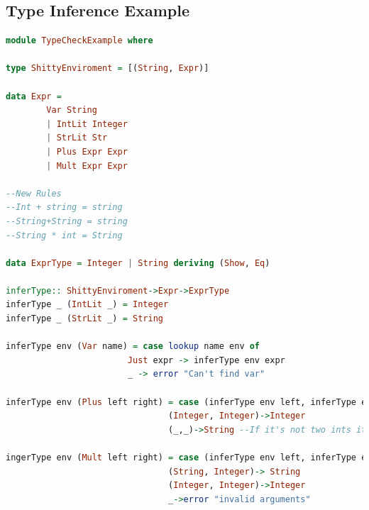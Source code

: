 \documentclass[tikz, border=5mm]{article}
\begin{document}
    \subsection{Type Inference Example}
    \begin{lstlisting}[language=Haskell]
module TypeCheckExample where

type ShittyEnviroment = [(String, Expr)]

data Expr = 
        Var String
        | IntLit Integer
        | StrLit Str
        | Plus Expr Expr
        | Mult Expr Expr

--New Rules
--Int + string = string
--String+String = string
--String * int = String

data ExprType = Integer | String deriving (Show, Eq)

inferType:: ShittyEnviroment->Expr->ExprType
inferType _ (IntLit _) = Integer
inferType _ (StrLit _) = String

inferType env (Var name) = case lookup name env of
                        Just expr -> inferType env expr
                        _ -> error "Can't find var"

inferType env (Plus left right) = case (inferType env left, inferType env right) of
                                (Integer, Integer)->Integer
                                (_,_)->String --If it's not two ints it's a string!

ingerType env (Mult left right) = case (inferType env left, inferType env right) of
                                (String, Integer)-> String
                                (Integer, Integer)->Integer
                                _->error "invalid arguments"
    \end{lstlisting}
\end{document}
